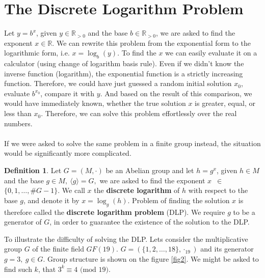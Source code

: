 \documentclass[thesis=M,english]{FITthesis}[2012/10/20]
\theoremstyle{remark}
\theoremstyle{definition}
\newtheorem{DF}{Definition}[section]
\begin{document}
\section{The Discrete Logarithm Problem}
Let $y = b^x$, given $y \in \mathbb{R}_{> 0}$ and the base $b \in \mathbb{R}_{>0}$, we are asked to find the exponent $x \in \mathbb{R}$. We can rewrite this problem from the exponential form to the logarithmic form, i.e. $x = \log_b(y)$. To find the $x$ we can easily evaluate it on a calculator (using change of logarithm basis rule). Even if we didn't know the inverse function (logarithm), the exponential function is a strictly increasing function. Therefore, we could have just guessed a random initial solution $x_0$, evaluate $b^{x_0}$, compare it with $y$. And based on the result of this comparison, we would have immediately known, whether the true solution $x$ is greater, equal, or less than $x_0$. Therefore, we can solve this problem effortlessly over the real numbers.
\\
\\
\noindent If we were asked to solve the same problem in a finite group instead, the situation would be significantly more complicated.
\begin{DF}
Let $G = (M, \cdot)$ be an Abelian group and let $h = g^x$, given $h \in M$ and the base $g \in M,\ \langle g \rangle = G,$ we are asked to find the exponent $x$~$\in$~$\{0,1, \ldots, \#G - 1\}.$ We call $x$ the \textbf{discrete logarithm} of $h$ with respect to the base $g$, and denote it by $x= \log_g(h)$. Problem of finding the solution $x$ is therefore called the \textbf{discrete logarithm problem} (DLP). We require $g$ to be a generator of $G$, in order to guarantee the existence of the solution to the DLP. 
\end{DF}
\noindent To illustrate the difficulty of solving the DLP. Lets consider the multiplicative group $G$ of the finite field $GF(19).$ $G = (\{1,2,\ldots,18\}, \cdot_{19})$ and its generator $g=3,\ g \in G$. Group structure is shown on the figure \ref{fig2}. We might be asked to find such $k$, that $3^k \equiv 4 \text{ (mod 19)}$. 
\end{document}
